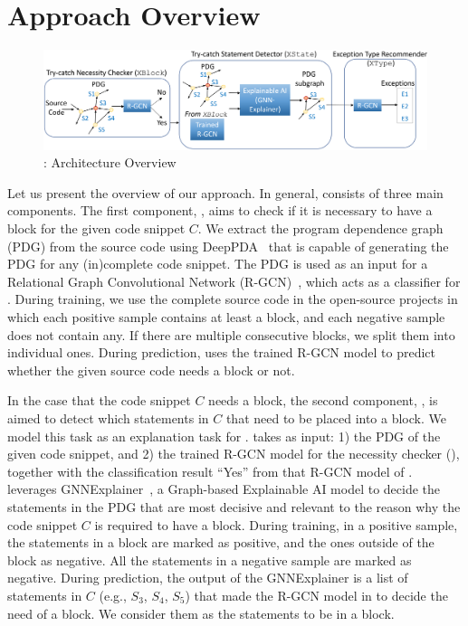 \section{Approach Overview}
\label{sec:overview}

\begin{figure}[t]
\begin{center}
\includegraphics[width=5.4in]{overview-2.png}
\vspace{-10pt}
\caption{{\tool}: Architecture Overview}
\label{overview}
\end{center}
\end{figure}

Let us present the overview of our approach. In general, {\tool}
consists of three main components. The first component, {\xblock},
aims to check if it is necessary to have a  block for
the given code snippet $C$. We extract the program dependence graph
(PDG) from the source code using DeepPDA~\cite{icse23} that is capable
of generating the PDG for any (in)complete code snippet. The PDG is
used as an input for a Relational Graph Convolutional Network
(R-GCN)~\cite{rgcn}, which acts as a classifier for {\xblock}. During
training, we use the complete source code in the open-source projects
in which each positive sample contains at least a 
block, and each negative sample does not contain any. If there are
multiple consecutive blocks, we split them into individual
ones. During prediction, {\xblock} uses the trained R-GCN model to predict
whether the given source code needs a  block or not.

In the case that the code snippet $C$ needs a  block,
the second component, {\xstate}, is aimed to detect which statements
in $C$ that need to be placed into a  block.  We model
this task as an explanation task for {\xblock}. {\xstate} takes as
input: 1) the PDG of the given code snippet, and 2) the trained R-GCN
model for the  necessity checker ({\xblock}), together
with the classification result ``Yes'' from that R-GCN model of
{\xblock}. {\xstate} leverages GNNExplainer~\cite{GNNExplainer}, a
Graph-based Explainable AI model to decide the statements in the PDG
that are most decisive and relevant to the reason why the code snippet
$C$ is required to have a  block. During training, in
a positive sample, the statements in a  block are
marked as positive, and the ones outside of the block as negative. All
the statements in a negative sample are marked as negative. During
prediction, the output of the GNNExplainer is a list of statements in
$C$ (e.g., $S_3$, $S_4$, $S_5$) that made the R-GCN model in {\xblock}
to decide the need of a  block. We consider them as
the statements to be in a  block.

